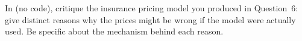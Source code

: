 \question[10]{}

In  (no code), critique the insurance pricing model you produced in Question~6: give  distinct reasons why the prices might be wrong if the model were actually used. Be specific about the mechanism behind each reason.

\ifanswerspace
\vfillstretch
\fi
